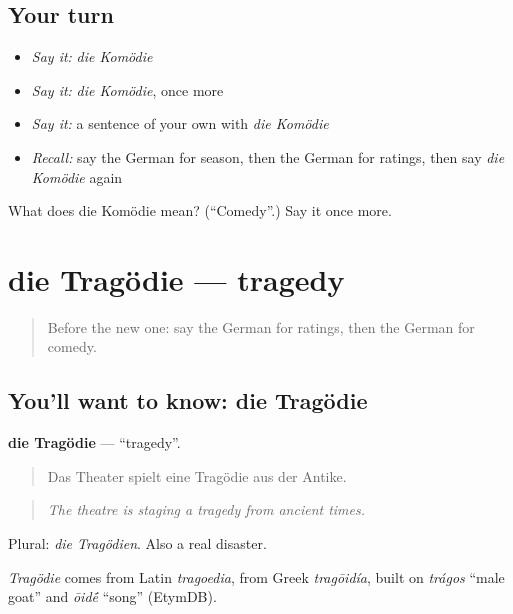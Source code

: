 \subsection*{Your turn}
\begin{itemize}
\raggedright
  \item \emph{Say it:} \emph{die Komödie}
  \item \emph{Say it:} \emph{die Komödie}, once more
  \item \emph{Say it:} a sentence of your own with \emph{die Komödie}
  \item \emph{Recall:} say the German for season, then the German for ratings, then say \emph{die Komödie} again
\end{itemize}

\begin{tcolorbox}[breakable,colback=teal!4,colframe=teal!35!black,title={Before you move on}]
What does die Komödie mean? (\textquotedblleft{}Comedy\textquotedblright{}.) Say it once more.
\end{tcolorbox}
\section[die Tragödie]{die Tragödie — tragedy}

\label{lesson:GE-C524-tragoedie}



\begin{quote}
Before the new one: say the German for ratings, then the German for comedy.
\end{quote}

\subsection*{You'll want to know: die Tragödie}
\textbf{die Tragödie} — \textquotedblleft{}tragedy\textquotedblright{}.

\begin{quote}
Das Theater spielt eine Tragödie aus der Antike.
\end{quote}

\begin{quote}
\emph{The theatre is staging a tragedy from ancient times.}
\end{quote}

Plural: \emph{die Tragödien}. Also a real disaster.

\begin{cousinweb}
\emph{Tragödie} comes from Latin \emph{tragoedia}, from Greek \emph{tragōidía}, built on \emph{trágos} \textquotedblleft{}male goat\textquotedblright{} and \emph{ōid\'{\={e}}} \textquotedblleft{}song\textquotedblright{} (EtymDB).
\end{cousinweb}

